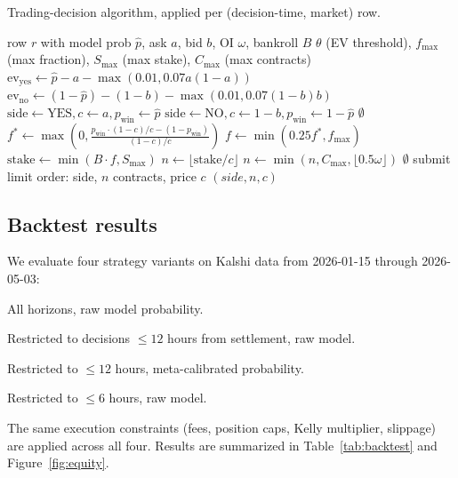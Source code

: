 \documentclass[11pt]{article}
\begin{document}
\begin{algorithm}[h]
\caption{Trading-decision algorithm, applied per (decision-time, market) row.}
\label{alg:trade}
\begin{algorithmic}[1]
\Require row $r$ with model prob $\hat{p}$, ask $a$, bid $b$, OI $\omega$, bankroll $B$
\Require $\theta$ (EV threshold), $f_{\max}$ (max fraction), $S_{\max}$ (max stake), $C_{\max}$ (max contracts)
\State $\text{ev}_\text{yes} \gets \hat{p} - a - \max(0.01, 0.07 a (1-a))$
\State $\text{ev}_\text{no} \gets (1-\hat{p}) - (1-b) - \max(0.01, 0.07 (1-b) b)$
    \State $\text{side} \gets \text{YES}, c \gets a, p_\text{win} \gets \hat{p}$
    \State $\text{side} \gets \text{NO}, c \gets 1 - b, p_\text{win} \gets 1 - \hat{p}$
\Else
    \State \Return $\emptyset$
\EndIf
\State $f^* \gets \max\!\left(0, \frac{p_\text{win} \cdot (1-c)/c - (1-p_\text{win})}{(1-c)/c}\right)$
\State $f \gets \min(0.25 f^*, f_{\max})$
\State $\text{stake} \gets \min(B \cdot f, S_{\max})$
\State $n \gets \lfloor \text{stake} / c \rfloor$
\State $n \gets \min(n, C_{\max}, \lfloor 0.5 \omega \rfloor)$
 \Return $\emptyset$ \EndIf
\State submit limit order: side, $n$ contracts, price $c$
\State \Return $(side, n, c)$
\end{algorithmic}
\end{algorithm}

\subsection{Backtest results}

We evaluate four strategy variants on Kalshi data from 2026-01-15 through
2026-05-03:
\begin{description}[leftmargin=*,topsep=2pt,itemsep=2pt]
\item[(A)] All horizons, raw model probability.
\item[(B)] Restricted to decisions $\le 12$ hours from settlement, raw model.
\item[(C)] Restricted to $\le 12$ hours, meta-calibrated probability.
\item[(D)] Restricted to $\le 6$ hours, raw model.
\end{description}
The same execution constraints (fees, position caps, Kelly multiplier,
slippage) are applied across all four. Results are summarized in
Table~\ref{tab:backtest} and Figure~\ref{fig:equity}.
\end{document}
